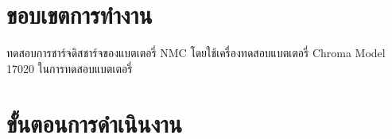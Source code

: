 \section{ขอบเขตการทำงาน}
ทดสอบการชาร์จดิสชาร์จของแบตเตอรี่ NMC โดยใช้เครื่องทดสอบแบตเตอรี่ Chroma Model 17020 ในการทดสอบแบตเตอรี่
\section{ขั้นตอนการดำเนินงาน}
\begin{center}

\end{center}
